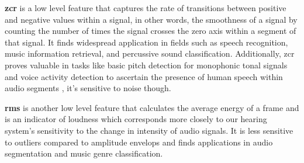 \textbf{\gls{zcr}} is a low level feature that captures the rate of transitions between positive and negative values within a signal, in other words,  the smoothness of a signal by counting the number of times the signal crosses the zero axis within a segment of that signal. It finds widespread application in fields such as speech recognition, music information retrieval, and percussive sound classification. Additionally, \gls{zcr} proves valuable in tasks like basic pitch detection for monophonic tonal signals and voice activity detection to ascertain the presence of human speech within audio segments \cite{Park2008}, it's sensitive to noise though. %






\textbf{\gls{rms}} is another low level feature that calculates the average energy of a frame and is an indicator of loudness which corresponds more closely to our hearing system’s sensitivity to the change in intensity of audio signals. It is less sensitive to outliers compared to amplitude envelops and finds applications in audio segmentation and music genre classification. 

